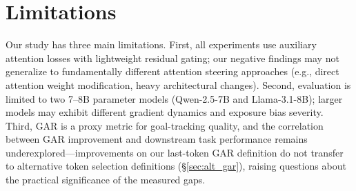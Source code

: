 \documentclass[11pt]{article}
\newcommand{\gar}{\textsc{GAR}}
\begin{document}
\section*{Limitations}

Our study has three main limitations. First, all experiments use auxiliary attention losses with lightweight residual gating; our negative findings may not generalize to fundamentally different attention steering approaches (e.g., direct attention weight modification, heavy architectural changes). Second, evaluation is limited to two 7--8B parameter models (Qwen-2.5-7B and Llama-3.1-8B); larger models may exhibit different gradient dynamics and exposure bias severity. Third, \gar{} is a proxy metric for goal-tracking quality, and the correlation between \gar{} improvement and downstream task performance remains underexplored---improvements on our last-token \gar{} definition do not transfer to alternative token selection definitions (\S\ref{sec:alt_gar}), raising questions about the practical significance of the measured gaps.
\end{document}
